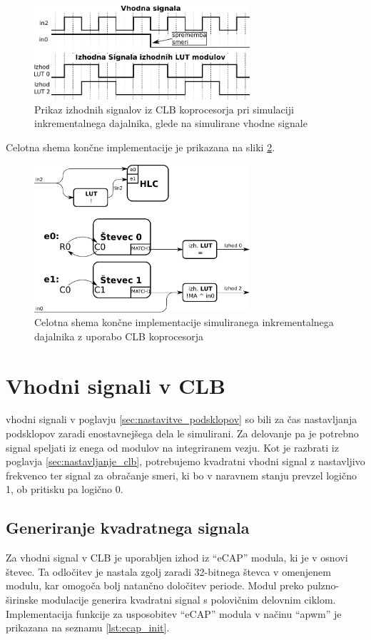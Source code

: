 \documentclass[a4paper]{article}
\begin{document}
\begin{sloppypar}
\begin{figure}[htb]
    \centerline{\includegraphics[width=8cm]{obracanje_smeri_potek}}
    \caption{Prikaz izhodnih signalov iz CLB koprocesorja pri simulaciji 
             inkrementalnega dajalnika, glede na simulirane vhodne signale}
    \label{fig:obracanje_smeri}
\end{figure}

Celotna shema končne implementacije je prikazana na sliki
\ref{fig:koncna_shema}.

\begin{figure}[htb]
    \centerline{\includegraphics[width=8cm]{koncna_shema}}
    \caption{Celotna shema končne implementacije simuliranega inkrementalnega
             dajalnika z uporabo CLB koprocesorja}
    \label{fig:koncna_shema}
\end{figure}

\section{Vhodni signali v CLB}
vhodni signali v poglavju \ref{sec:nastavitve_podsklopov} so bili za čas
nastavljanja podsklopov zaradi enostavnejšega dela le simulirani. Za delovanje
pa je potrebno signal speljati iz enega od modulov na integriranem vezju. Kot
je razbrati iz poglavja \ref{sec:nastavljanje_clb}, potrebujemo kvadratni
vhodni signal z nastavljivo frekvenco ter signal za obračanje smeri, ki bo v
naravnem stanju prevzel logično 1, ob pritisku pa logično 0.

\subsection{Generiranje kvadratnega signala}
Za vhodni signal v CLB je uporabljen izhod iz ``eCAP'' modula, ki je v osnovi
števec. Ta odločitev je nastala zgolj zaradi 32-bitnega števca v omenjenem
modulu, kar omogoča bolj natančno določitev periode. Modul preko
pulzno-širinske modulacije generira kvadratni signal s polovičnim delovnim
ciklom. Implementacija funkcije za usposobitev ``eCAP'' modula v načinu
``apwm'' je prikazana na seznamu \ref{lst:ecap_init}.


\end{sloppypar}
\end{document}
